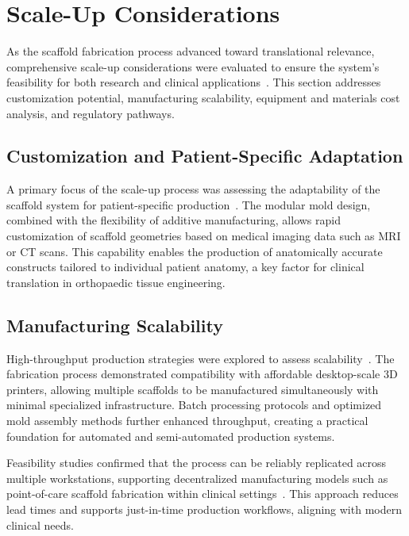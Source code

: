 \section{Scale-Up Considerations}

As the scaffold fabrication process advanced toward translational relevance, comprehensive scale-up considerations were evaluated to ensure the system's feasibility for both research and clinical applications~\cite{ateshian2015patientspecificarticular}. This section addresses customization potential, manufacturing scalability, equipment and materials cost analysis, and regulatory pathways.

\subsection{Customization and Patient-Specific Adaptation}

A primary focus of the scale-up process was assessing the adaptability of the scaffold system for patient-specific production~\cite{filardo2019patientspecificmeniscus}. The modular mold design, combined with the flexibility of additive manufacturing, allows rapid customization of scaffold geometries based on medical imaging data such as MRI or CT scans. This capability enables the production of anatomically accurate constructs tailored to individual patient anatomy, a key factor for clinical translation in orthopaedic tissue engineering.

\subsection{Manufacturing Scalability}

High-throughput production strategies were explored to assess scalability~\cite{vedadghavami2017manufacturinghydrogel}. The fabrication process demonstrated compatibility with affordable desktop-scale 3D printers, allowing multiple scaffolds to be manufactured simultaneously with minimal specialized infrastructure. Batch processing protocols and optimized mold assembly methods further enhanced throughput, creating a practical foundation for automated and semi-automated production systems. 

Feasibility studies confirmed that the process can be reliably replicated across multiple workstations, supporting decentralized manufacturing models such as point-of-care scaffold fabrication within clinical settings~\cite{elkommos2024developmentimproved,elkommos2025hybridhydrogels,morin2021individualaccelerationspeed,methodstesting}. This approach reduces lead times and supports just-in-time production workflows, aligning with modern clinical needs.

